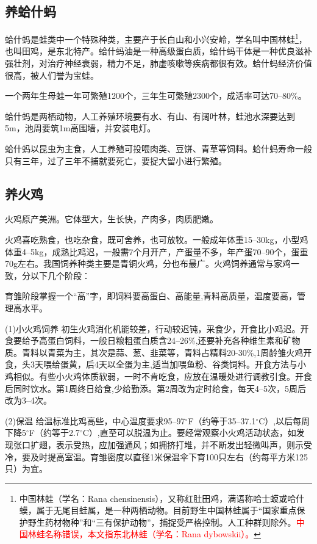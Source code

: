 \documentclass{ctexbook}
\begin{document}
\subsection{养蛤什蚂}
蛤什蚂是蛙类中一个特殊种类，主要产于长白山和小兴安岭，学名叫中国林蛙\footnote{中国林蛙（学名：Rana chensinensis），又称红肚田鸡，满语称哈士蟆或哈什蟆，属于无尾目蛙属，是一种两栖动物。目前野生中国林蛙属于“国家重点保护野生药材物种”和“三有保护动物”，捕捉受严格控制。人工种群则除外。\textcolor{red}{中国林蛙名称错误，本文指东北林蛙（学名：Rana dybowskii）。}}，也叫田鸡，是东北特产。蛤什蚂油是一种高级蛋白质，蛤什蚂干体是一种优良滋补强壮剂，对治疗神经衰弱，精力不足，肺虚咳嗽等疾病都很有效。蛤什蚂经济价值很高，被人们誉为宝蛙。

一个两年生母蛙一年可繁殖1200个，三年生可繁殖2300个，成活率可达70--80\%。

蛤什蚂是两栖动物，人工养殖环境要有水、有山、有阔叶林，蛙池水深要达到5m，池周要筑1m高围墙，并安装电灯。

蛤什蚂以昆虫为主食，人工养殖可投喂肉类、豆饼、青草等饲料。蛤什蚂寿命一般只有三年，过了三年不捕就要死亡，要捉大留小进行繁殖。
\subsection{养火鸡}
火鸡原产美洲。它体型大，生长快，产肉多，肉质肥嫩。

火鸡喜吃熟食，也吃杂食，既可舍养，也可放牧。一般成年体重15--30kg，小型鸡体重4--5kg，成熟比鸡迟，一般需7个月开产，产蛋量不多，年产蛋70--90个，蛋重70g左右。我国饲养种类主要是青铜火鸡，分也布最广。火鸡饲养通常与家鸡一致，分以下几个阶段：

育雏阶段掌握一个“高”字，即饲料要高蛋白、高能量,青料高质量，温度要高，管理高水平。

(1)小火鸡饲养 初生火鸡消化机能较差，行动较迟钝，采食少，开食比小鸡迟。开食要给予高蛋白饲料，一般日粮粗蛋白质含24--26\%,还要补充各种维生素和矿物质。青料以青菜为主，其次是蒜、葱、韭菜等，青料占精料20-30\%,1周龄雏火鸡开食，头3天喂给蛋黄，后4天以全蛋为主,适当加喂鱼粉、谷类饲料。开食方法与小鸡相似。有些小火鸡体质软弱，一时不肯吃食，应放在温暖处进行调教引食。开食后同时饮水。第1周终日给食,少给勤添。第2周改为定时给食，每天4--5次，5周后改为3--4次。

(2)保温 给温标准比鸡高些，中心温度要求95--97$^{\circ}$F（约等于35--37.1$^{\circ}$C）,以后每周下降5$^{\circ}$F（约等于2.7$^{\circ}$C）,直至可以脱温为止。要经常观察小火鸡活动状态，如发现张口扩翅，表示受热，应加强通风；如拥挤打堆，并不断发出轻微叫声，则示受冷，要及时提高室温。育雏密度以直径1米保温伞下育100只左右（约每平方米125只）为宜。
\end{document}
